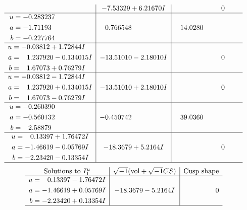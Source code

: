 \documentclass[1p]{elsarticle_modified}
\theoremstyle{definition}
\newcommand{\I}{\sqrt{-1}}
\begin{document}
$$\begin{array}{c|c|c}
 & -7.53329 + 6.21670 I & \phantom{-0.000000 } 0 \\ \hline\begin{aligned}
u &= -0.283237\phantom{ +0.000000I} \\
a &= -1.71193\phantom{ +0.000000I} \\
b &= -0.227764\phantom{ +0.000000I}\end{aligned}
 & \phantom{-}0.766548\phantom{ +0.000000I} & \phantom{-}14.0280\phantom{ +0.000000I} \\ \hline\begin{aligned}
u &= -0.03812 + 1.72844 I \\
a &= \phantom{-}1.237920 - 0.134015 I \\
b &= \phantom{-}1.67073 + 0.76279 I\end{aligned}
 & -13.51010 - 2.18010 I & \phantom{-0.000000 } 0 \\ \hline\begin{aligned}
u &= -0.03812 - 1.72844 I \\
a &= \phantom{-}1.237920 + 0.134015 I \\
b &= \phantom{-}1.67073 - 0.76279 I\end{aligned}
 & -13.51010 + 2.18010 I & \phantom{-0.000000 } 0 \\ \hline\begin{aligned}
u &= -0.260390\phantom{ +0.000000I} \\
a &= -0.560132\phantom{ +0.000000I} \\
b &= \phantom{-}2.58879\phantom{ +0.000000I}\end{aligned}
 & -0.450742\phantom{ +0.000000I} & \phantom{-}39.0360\phantom{ +0.000000I} \\ \hline\begin{aligned}
u &= \phantom{-}0.13397 + 1.76472 I \\
a &= -1.46619 - 0.05769 I \\
b &= -2.23420 - 0.13354 I\end{aligned}
 & -18.3679 + 5.2164 I & \phantom{-0.000000 } 0\\
 \hline 
 \end{array}$$\newpage$$\begin{array}{c|c|c}  
\text{Solutions to }I^u_{1}& \I (\text{vol} + \sqrt{-1}CS) & \text{Cusp shape}\\
 \hline 
\begin{aligned}
u &= \phantom{-}0.13397 - 1.76472 I \\
a &= -1.46619 + 0.05769 I \\
b &= -2.23420 + 0.13354 I\end{aligned}
 & -18.3679 - 5.2164 I & \phantom{-0.000000 } 0\\
 \hline 
 \end{array}$$\newpage\newpage\renewcommand{\arraystretch}{1}
\end{document}
